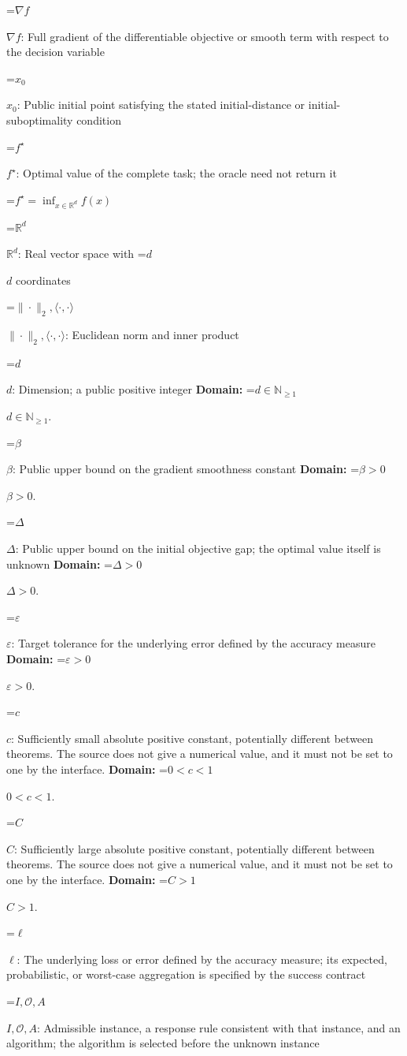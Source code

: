 \documentclass[10pt,a4paper]{article}
\newcommand{\AtlasMath}[1]{\par\begingroup\centering\setbox0=\hbox{$\displaystyle #1$}\ifdim\wd0>1.4\linewidth\typeout{ATLAS WIDE FORMULA: \the\wd0}\fi\ifdim\wd0>\linewidth\resizebox{\linewidth}{!}{\box0}\else\box0\fi\par\endgroup}
\newcommand{\AtlasInlineMath}[1]{\begingroup\setbox0=\hbox{$#1$}\ifdim\wd0>.4\linewidth\endgroup\AtlasMath{#1}\else\endgroup$#1$\fi}
\begin{document}
\AtlasInlineMath{\nabla f}: Full gradient of the differentiable objective or smooth term with respect to the decision variable

\AtlasInlineMath{x_0}: Public initial point satisfying the stated initial-distance or initial-suboptimality condition

\AtlasInlineMath{f^\star}: Optimal value of the complete task; the oracle need not return it




\AtlasMath{f^\star=\inf_{x\in \mathbb{R}^d}f(x)}




\AtlasInlineMath{\mathbb{R}^d}: Real vector space with \AtlasInlineMath{d} coordinates

\AtlasInlineMath{\|\cdot\|_2,\langle\cdot,\cdot\rangle}: Euclidean norm and inner product

\AtlasInlineMath{d}: Dimension; a public positive integer \textbf{Domain:} \AtlasInlineMath{d\in\mathbb{N}_{\ge1}}.

\AtlasInlineMath{\beta}: Public upper bound on the gradient smoothness constant \textbf{Domain:} \AtlasInlineMath{\beta>0}.

\AtlasInlineMath{\Delta}: Public upper bound on the initial objective gap; the optimal value itself is unknown \textbf{Domain:} \AtlasInlineMath{\Delta>0}.

\AtlasInlineMath{\varepsilon}: Target tolerance for the underlying error defined by the accuracy measure \textbf{Domain:} \AtlasInlineMath{\varepsilon>0}.

\AtlasInlineMath{c}: Sufficiently small absolute positive constant, potentially different between theorems. The source does not give a numerical value, and it must not be set to one by the interface. \textbf{Domain:} \AtlasInlineMath{0<c<1}.

\AtlasInlineMath{C}: Sufficiently large absolute positive constant, potentially different between theorems. The source does not give a numerical value, and it must not be set to one by the interface. \textbf{Domain:} \AtlasInlineMath{C>1}.

\AtlasInlineMath{\ell}: The underlying loss or error defined by the accuracy measure; its expected, probabilistic, or worst-case aggregation is specified by the success contract

\AtlasInlineMath{I,\mathcal{O},A}: Admissible instance, a response rule consistent with that instance, and an algorithm; the algorithm is selected before the unknown instance
\end{document}

